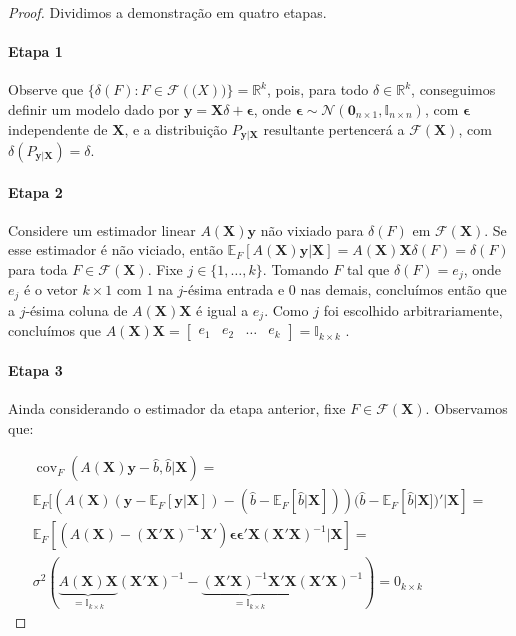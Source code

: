 \documentclass[12pt,a4paper]{article}
\begin{document}
\begin{proof}
Dividimos a demonstração em quatro etapas.
\paragraph{Etapa 1} Observe que $\{\delta(F) : F \in \mathcal{F}(\boldsymbol(X))\} = \mathbb{R}^k$, pois, para todo $\delta \in \mathbb{R}^k$, conseguimos definir um modelo dado por $\boldsymbol{y}=\boldsymbol{X}\delta + \boldsymbol{\epsilon}$, onde $\boldsymbol{\epsilon} \sim \mathcal{N}(\boldsymbol{0}_{n\times 1},\mathbb{I}_{n\times n})$, com $\boldsymbol{\epsilon}$ independente de $\boldsymbol{X}$, e a distribuição $P_{\boldsymbol{y}|\boldsymbol{X}}$ resultante pertencerá a $\mathcal{F}(\boldsymbol{X})$, com $\delta(P_{\boldsymbol{y}|\boldsymbol{X}})=\delta$.
\paragraph{Etapa 2} Considere um estimador linear $A(\boldsymbol{X})\boldsymbol{y}$ não vixiado para $\delta(F)$ em $\mathcal{F}(\boldsymbol{X})$. Se esse estimador é não viciado, então $\mathbb{E}_F[A(\boldsymbol{X})\boldsymbol{y}|\boldsymbol{X}]=A(\boldsymbol{X})\boldsymbol{X}\delta(F) = \delta(F)$ para toda $F \in \mathcal{F}(\boldsymbol{X})$. Fixe $j \in \{1,\ldots, k\}$. Tomando $F$ tal que $\delta(F) = e_j$, onde $e_j$ é o vetor $k\times 1$ com $1$ na $j$-ésima entrada e $0$ nas demais, concluímos então que a $j$-ésima coluna de $A(\boldsymbol{X})\boldsymbol{X}$ é igual a $e_j$. Como $j$ foi escolhido arbitrariamente, concluímos que $A(\boldsymbol{X})\boldsymbol{X} = \begin{bmatrix}e_1 & e_2& \ldots & e_k\end{bmatrix} = \mathbb{I}_{k \times k}$ .
\paragraph{Etapa 3} Ainda considerando o estimador da etapa anterior, fixe $F \in \mathcal{F}(\boldsymbol{X})$. Observamos que: 

\begin{equation*}
\begin{aligned}
\operatorname{cov}_F(A(\boldsymbol{X})\boldsymbol{y}-\hat{b},\hat{b}|\boldsymbol{X}) =\\ \mathbb{E}_F[(A(\boldsymbol{X})(\boldsymbol{y}-\mathbb{E}_F[\boldsymbol{y}|\boldsymbol{X}])-(\hat{b}-\mathbb{E}_F[\hat{b}|\boldsymbol{X}]))(\hat{b}-\mathbb{E}_F[\hat{b}|\boldsymbol{X}])'|\boldsymbol{X}] = \\
\mathbb{E}_F[(A(\boldsymbol{X}) - (\boldsymbol{X}'\boldsymbol{X})^{-1}\boldsymbol{X}')\boldsymbol{\epsilon}\boldsymbol{\epsilon}'\boldsymbol{X} (\boldsymbol{X}'\boldsymbol{X})^{-1}|\boldsymbol{X}] = \\
\sigma^2(\underbrace{A(\boldsymbol{X})\boldsymbol{X}}_{=\mathbb{I}_{k\times k}} (\boldsymbol{X}'\boldsymbol{X})^{-1} -       \underbrace{(\boldsymbol{X}'\boldsymbol{X})^{-1}\boldsymbol{X}' \boldsymbol{X}}_{=\mathbb{I}_{k\times k}} (\boldsymbol{X}'\boldsymbol{X})^{-1}) = 0_{k\times k}
\end{aligned}
\end{equation*}


\end{proof}
\end{document}
